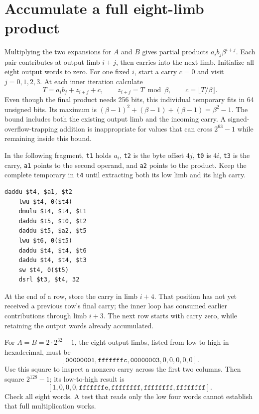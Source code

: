 \section{Accumulate a full eight-limb product}
Multiplying the two expansions for \(A\) and \(B\) gives partial products
\(a_i b_j \beta^{i+j}\). Each pair contributes at output limb \(i+j\), then carries
into the next limb. Initialize all eight output words to zero. For one fixed \(i\),
start a carry \(c=0\) and visit \(j=0,1,2,3\). At each inner iteration calculate
\[
  T=a_i b_j+z_{i+j}+c,\qquad
  z_{i+j}=T\bmod\beta,\qquad c=\lfloor T/\beta\rfloor.
\]
Even though the final product needs 256 bits, this individual temporary fits in
64 unsigned bits. Its maximum is
\((\beta-1)^2+(\beta-1)+(\beta-1)=\beta^2-1\). The bound includes both the existing output limb
and the incoming carry. A signed-overflow-trapping addition is inappropriate for
values that can cross \(2^{63}-1\) while remaining inside this bound.

In the following fragment, \texttt{t1} holds \(a_i\), \texttt{t2} is the byte offset
\(4j\), \texttt{t0} is \(4i\), \texttt{t3} is the carry, \texttt{a1} points to the
second operand, and \texttt{a2} points to the product. Keep the complete temporary
in \texttt{t4} until extracting both its low limb and its high carry.

\begin{verbatim}
daddu $t4, $a1, $t2
    lwu $t4, 0($t4)
    dmulu $t4, $t4, $t1
    daddu $t5, $t0, $t2
    daddu $t5, $a2, $t5
    lwu $t6, 0($t5)
    daddu $t4, $t4, $t6
    daddu $t4, $t4, $t3
    sw $t4, 0($t5)
    dsrl $t3, $t4, 32
\end{verbatim}

At the end of a row, store the carry in limb \(i+4\). That position has not yet
received a previous row's final carry; the inner loop has consumed earlier
contributions through limb \(i+3\). The next row starts with carry zero, while
retaining the output words already accumulated.

For \(A=B=2\cdot2^{32}-1\), the eight output limbs, listed from low to high in
hexadecimal, must be
\[
  [\mathtt{00000001},\mathtt{fffffffc},\mathtt{00000003},0,0,0,0,0].
\]
Use this square to inspect a nonzero carry across the first two columns. Then square
\(2^{128}-1\); its low-to-high result is
\[
  [1,0,0,0,\mathtt{fffffffe},\mathtt{ffffffff},
    \mathtt{ffffffff},\mathtt{ffffffff}].
\]
Check all eight words. A test that reads only the low four words cannot establish
that full multiplication works.
